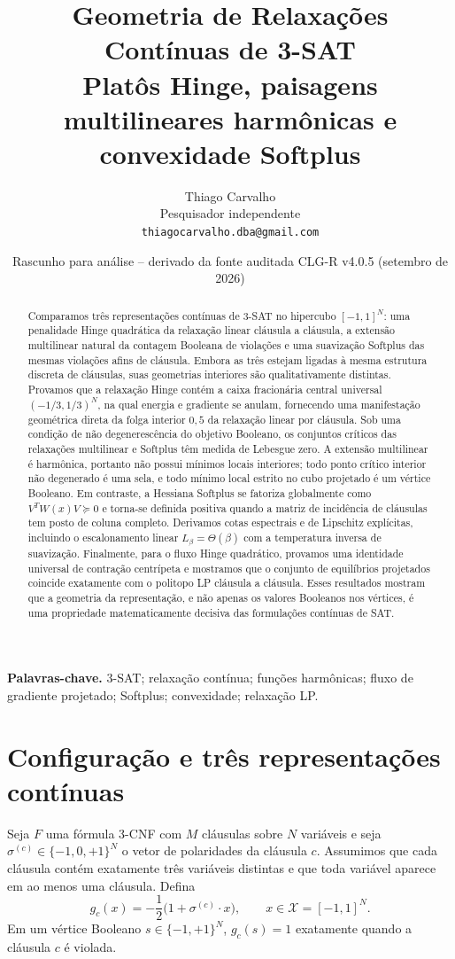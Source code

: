 \documentclass[11pt,a4paper]{article}
\title{\textbf{Geometria de Relaxações Contínuas de 3-SAT}\\[0.3em]
\large Platôs Hinge, paisagens multilineares harmônicas e convexidade Softplus}
\author{Thiago Carvalho\\Pesquisador independente\\\texttt{thiagocarvalho.dba@gmail.com}}
\date{Rascunho para análise -- derivado da fonte auditada CLG-R v4.0.5 (setembro de 2026)}
\begin{document}
\maketitle

\begin{abstract}
Comparamos três representações contínuas de 3-SAT no hipercubo $[-1,1]^N$: uma penalidade Hinge quadrática da relaxação linear cláusula a cláusula, a extensão multilinear natural da contagem Booleana de violações e uma suavização Softplus das mesmas violações afins de cláusula. Embora as três estejam ligadas à mesma estrutura discreta de cláusulas, suas geometrias interiores são qualitativamente distintas. Provamos que a relaxação Hinge contém a caixa fracionária central universal $(-1/3,1/3)^N$, na qual energia e gradiente se anulam, fornecendo uma manifestação geométrica direta da folga interior $0{,}5$ da relaxação linear por cláusula. Sob uma condição de não degenerescência do objetivo Booleano, os conjuntos críticos das relaxações multilinear e Softplus têm medida de Lebesgue zero. A extensão multilinear é harmônica, portanto não possui mínimos locais interiores; todo ponto crítico interior não degenerado é uma sela, e todo mínimo local estrito no cubo projetado é um vértice Booleano. Em contraste, a Hessiana Softplus se fatoriza globalmente como $V^TW(x)V\succeq0$ e torna-se definida positiva quando a matriz de incidência de cláusulas tem posto de coluna completo. Derivamos cotas espectrais e de Lipschitz explícitas, incluindo o escalonamento linear $L_\beta=\Theta(\beta)$ com a temperatura inversa de suavização. Finalmente, para o fluxo Hinge quadrático, provamos uma identidade universal de contração centrípeta e mostramos que o conjunto de equilíbrios projetados coincide exatamente com o politopo LP cláusula a cláusula. Esses resultados mostram que a geometria da representação, e não apenas os valores Booleanos nos vértices, é uma propriedade matematicamente decisiva das formulações contínuas de SAT.
\end{abstract}

\noindent\textbf{Palavras-chave.} 3-SAT; relaxação contínua; funções harmônicas; fluxo de gradiente projetado; Softplus; convexidade; relaxação LP.

\section{Configuração e três representações contínuas}
Seja $F$ uma fórmula 3-CNF com $M$ cláusulas sobre $N$ variáveis e seja $\sigma^{(c)}\in\{-1,0,+1\}^N$ o vetor de polaridades da cláusula $c$. Assumimos que cada cláusula contém exatamente três variáveis distintas e que toda variável aparece em ao menos uma cláusula. Defina
\begin{equation}
g_c(x)=-\frac12\bigl(1+\sigma^{(c)}\cdot x\bigr),\qquad x\in\mathcal X=[-1,1]^N.
\end{equation}
Em um vértice Booleano $s\in\{-1,+1\}^N$, $g_c(s)=1$ exatamente quando a cláusula $c$ é violada.
\end{document}
